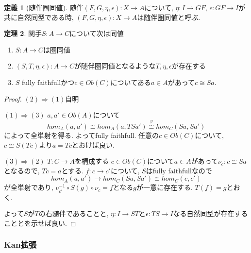 \documentclass[dvipdfmx,a4paper,11pt]{article}
\theoremstyle{definition}
\newtheorem{thm}{定理}
\newtheorem{dfn}[thm]{定義}
\begin{document}
 \begin{tcolorbox}
 [colback = white, colframe = green!35!black, fonttitle = \bfseries,breakable = true]
\begin{dfn}[随伴圏同値]
随伴$(F,G,\eta,\epsilon): X \to A$について, $\eta : I \to GF$, $\epsilon : GF \to I$が共に自然同型である時, 
$(F,G,\eta,\epsilon): X \to A$は随伴圏同値と呼ぶ. 
\end{dfn}
\end{tcolorbox}

 \begin{tcolorbox}
 [colback = white, colframe = green!35!black, fonttitle = \bfseries,breakable = true]
\begin{thm}
\label{thm-adjoint-equiv}
関手$S : A \to C$について次は同値
\begin{enumerate}
\item $S : A \to C$は圏同値
\item $(S,T,\eta,\epsilon): A\to C$が随伴圏同値となるような$T,\eta,\epsilon$が存在する
\item $S$ fully faithfullかつ$c \in Ob(C)$についてある$a \in A$があって$c \cong Sa$.
\end{enumerate}
\end{thm}
\end{tcolorbox}
\begin{proof}
$(2) \Rightarrow (1)$自明

$(1) \Rightarrow (3)$
$a, a' \in Ob(A)$について
$$
hom_{A}(a, a') \cong hom_{A}(a ,TSa') \overset{\varphi}{\cong} hom_{C}(Sa, Sa') 
$$
によって全単射を得る. よってfully faithfull.
任意の$c \in Ob(C)$について, $c \cong S(Tc)$より$a=Tc$とおけば良い.


$(3) \Rightarrow (2)$
$T : C \to A$を構成する
$c \in Ob(C)$について$a \in A$があって$\nu_c : c \cong Sa$となるので, $Tc = a$とする.
$f  : c \to c'$について, $S$はfully faithfullなので
$$
hom_{A}(a,a') \to hom_{C}(Sa, Sa') \cong hom_{C}(c, c')
$$
が全単射であり, $\nu_{c'}^{-1}\circ S(g) \circ \nu_{c}=f$となる$g$が一意に存在する.
$T(f) = g$とおく.

よって$S$が$T$の右随伴であることと, $\eta : I \to ST$と$\epsilon : TS \to I$なる自然同型が存在することとを示せば良い.
\end{proof}



\subsubsection{Kan拡張}
\label{subsubsec-Kan}
\end{document}
